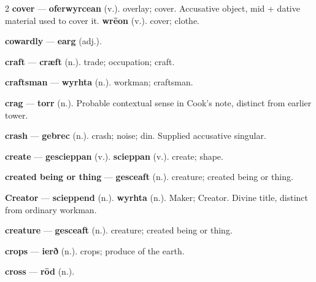 \begin{multicols}{2}
\textbf{cover} — \textbf{oferwyrcean} (v.). overlay; cover. Accusative object, mid + dative material used to cover it. \textbf{wrēon} (v.). cover; clothe.\par
\textbf{cowardly} — \textbf{earg} (adj.).\par
\textbf{craft} — \textbf{cræft} (n.). trade; occupation; craft.\par
\textbf{craftsman} — \textbf{wyrhta} (n.). workman; craftsman.\par
\textbf{crag} — \textbf{torr} (n.). Probable contextual sense in Cook's note, distinct from earlier tower.\par
\textbf{crash} — \textbf{gebrec} (n.). crash; noise; din. Supplied accusative singular.\par
\textbf{create} — \textbf{gescieppan} (v.).  \textbf{scieppan} (v.). create; shape.\par
\textbf{created being or thing} — \textbf{gesceaft} (n.). creature; created being or thing.\par
\textbf{Creator} — \textbf{scieppend} (n.).  \textbf{wyrhta} (n.). Maker; Creator. Divine title, distinct from ordinary workman.\par
\textbf{creature} — \textbf{gesceaft} (n.). creature; created being or thing.\par
\textbf{crops} — \textbf{ierð} (n.). crops; produce of the earth.\par
\textbf{cross} — \textbf{rōd} (n.).\par

\end{multicols}
